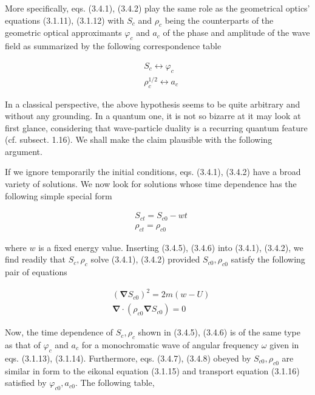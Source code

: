 \documentclass{article}
\begin{document}
More specifically, eqs. (3.4.1), (3.4.2) play the same role as the geometrical optics' equations (3.1.11), (3.1.12) with $S_{c}$ and $\rho_{c}$ being the counterparts of the geometric optical approximants $\varphi_{c}$ and $a_{c}$ of the phase and amplitude of the wave field as summarized by the following correspondence table
 
\begin{align*}
& S_{c} \longleftrightarrow \varphi_{c}  \tag{3.4.3}\\
& \rho_{c}^{1 / 2} \longleftrightarrow a_{c} \tag{3.4.4}
\end{align*}
 

In a classical perspective, the above hypothesis seems to be quite arbitrary and without any grounding. In a quantum one, it is not so bizarre at it may look at first glance, considering that wave-particle duality is a recurring quantum feature (cf. subsect. 1.16). We shall make the claim plausible with the following argument.

If we ignore temporarily the initial conditions, eqs. (3.4.1), (3.4.2) have a broad variety of solutions. We now look for solutions whose time dependence has
the following simple special form
 
\begin{align*}
& S_{c t}=S_{c 0}-w t  \tag{3.4.5}\\
& \rho_{c t}=\rho_{c 0} \tag{3.4.6}
\end{align*}
 
where $w$ is a fixed energy value. Inserting (3.4.5), (3.4.6) into (3.4.1), (3.4.2), we find readily that $S_{c}, \rho_{c}$ solve (3.4.1), (3.4.2) provided $S_{c 0}, \rho_{c 0}$ satisfy the following pair of equations
 
\begin{align*}
& \left(\boldsymbol{\nabla} S_{c 0}\right)^{2}=2 m(w-U)  \tag{3.4.7}\\
& \boldsymbol{\nabla} \cdot\left(\rho_{c 0} \boldsymbol{\nabla} S_{c 0}\right)=0 \tag{3.4.8}
\end{align*}
 

Now, the time dependence of $S_{c}, \rho_{c}$ shown in (3.4.5), (3.4.6) is of the same type as that of $\varphi_{c}$ and $a_{c}$ for a monochromatic wave of angular frequency $\omega$ given in eqs. (3.1.13), (3.1.14). Furthermore, eqs. (3.4.7), (3.4.8) obeyed by $S_{c 0}, \rho_{c 0}$ are similar in form to the eikonal equation (3.1.15) and transport equation (3.1.16) satisfied by $\varphi_{c 0}, a_{c 0}$. The following table,
 
\end{document}
